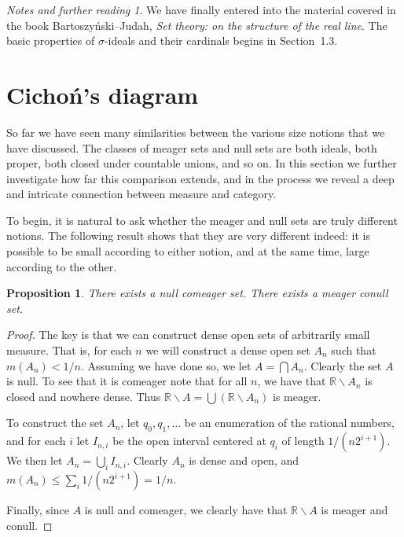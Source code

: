 \documentclass[11pt,oneside]{amsbook}
\newcommand{\RR}{\mathbb R}
\theoremstyle{definition}
\theoremstyle{plain}
\newtheorem{prop}[thm]{Proposition}
\theoremstyle{definition}
\theoremstyle{remark}
\newtheorem*{notes}{Notes and further reading}
\numberwithin{equation}{section}
\numberwithin{figure}{section}
\begin{document}
\begin{notes}
  We have finally entered into the material covered in the book Bartoszy\'nski--Judah, \emph{Set theory: on the structure of the real line}. The basic properties of $\sigma$-ideals and their cardinals begins in Section~1.3.
\end{notes}


\section{Cicho\'n's diagram}

So far we have seen many similarities between the various size notions that we have discussed. The classes of meager sets and null sets are both ideals, both proper, both closed under countable unions, and so on. In this section we further investigate how far this comparison extends, and in the process we reveal a deep and intricate connection between measure and category.

To begin, it is natural to ask whether the meager and null sets are truly different notions. The following result shows that they are very different indeed: it is possible to be small according to either notion, and at the same time, large according to the other.

\begin{prop}
  \label{prop:null-comeager}
  There exists a null comeager set. There exists a meager conull set.  \end{prop}

\begin{proof}
  The key is that we can construct dense open sets of arbitrarily small measure. That is, for each $n$ we will construct a dense open set $A_n$ such that $m(A_n)<1/n$. Assuming we have done so, we let $A=\bigcap A_n$. Clearly the set $A$ is null. To see that it is comeager note that for all $n$, we have that $\RR\smallsetminus A_n$ is closed and nowhere dense. Thus $\RR\smallsetminus A=\bigcup(\RR\smallsetminus A_n)$ is meager.

  To construct the set $A_n$, let $q_0,q_1,\ldots$ be an enumeration of the rational numbers, and for each $i$ let $I_{n,i}$ be the open interval centered at $q_i$ of length $1/(n2^{i+1})$. We then let $A_n=\bigcup_iI_{n,i}$. Clearly $A_n$ is dense and open, and $m(A_n)\leq\sum_i1/(n2^{i+1})=1/n$.

  Finally, since $A$ is null and comeager, we clearly have that $\RR\smallsetminus A$ is meager and conull.
\end{proof}
\end{document}
